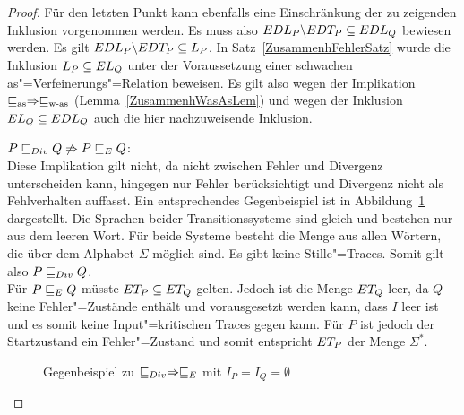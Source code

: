 \begin{proof}
  Für den letzten Punkt kann ebenfalls eine Einschränkung der zu zeigenden
  Inklusion vorgenommen werden. Es muss also $EDL _P \backslash EDT _P
  \subseteq EDL _Q$ bewiesen werden. Es gilt $EDL _P\backslash EDT _P
  \subseteq L _P$. In Satz~\ref{ZusammenhFehlerSatz} wurde die Inklusion
  $L _P\subseteq EL _Q$ unter der Voraussetzung einer schwachen
  as"=Verfeinerungs"=Relation beweisen. Es gilt also wegen der Implikation
  $\sqsubseteq _{\mathrm{as}} \Rightarrow \sqsubseteq _{\mathrm{w}\text{-}\mathrm{as}}$ (Lemma~\ref{ZusammenhWasAsLem}) und wegen der
  Inklusion $EL _Q \subseteq EDL _Q$ auch die hier nachzuweisende
  Inklusion.

  $P  \sqsubseteq  _{Div} Q \not\Rightarrow P  \sqsubseteq  _E Q$:\\
  Diese Implikation gilt nicht, da \DRel{} nicht zwischen Fehler und Divergenz
  unterscheiden kann, \ERel{} hingegen nur Fehler berücksichtigt und Divergenz
  nicht als Fehlverhalten auffasst. Ein entsprechendes Gegenbeispiel ist in
  Abbildung~\ref{DivEGegenBsp} dargestellt. Die Sprachen beider
  Transitionssysteme sind gleich und bestehen nur aus dem leeren Wort. Für
  beide Systeme besteht die Menge \EDT{} aus allen Wörtern, die über dem
  Alphabet $\Sigma$ möglich sind. Es gibt keine Stille"=Traces. Somit gilt also
  $P  \sqsubseteq  _{Div} Q$.\\
  Für $P  \sqsubseteq  _E Q$ müsste $ET _P \subseteq ET _Q$ gelten. Jedoch ist die Menge
  $ET _Q$ leer, da $Q$ keine Fehler"=Zustände enthält und vorausgesetzt werden
  kann, dass $I$ leer ist und es somit keine Input"=kritischen Traces gegen
  kann. Für $P$ ist jedoch der Startzustand ein Fehler"=Zustand und somit
  entspricht $ET _P$ der Menge $\Sigma ^*$.

  \begin{figure}[htbp]
    \begin{center}
      \caption{Gegenbeispiel zu $ \sqsubseteq  _{Div} \Rightarrow  \sqsubseteq  _E$ mit $I_P = I_Q =
      \emptyset$}
      \label{DivEGegenBsp}
    \end{center}
  \end{figure}


\end{proof}
